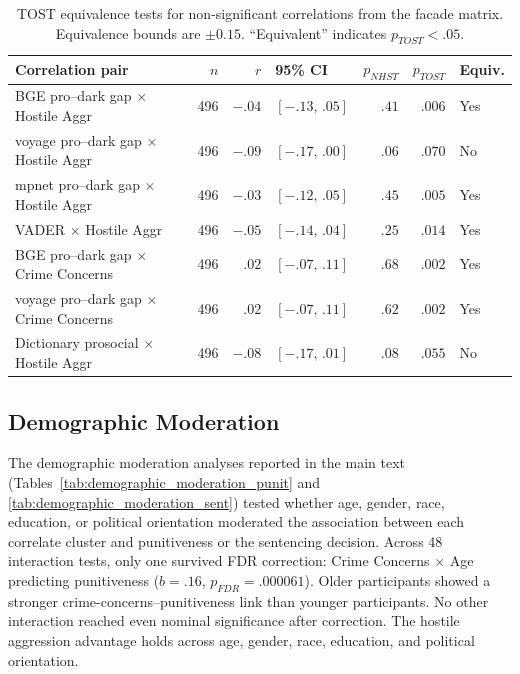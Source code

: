 \begin{table}[htbp]
  \centering
  \caption{TOST equivalence tests for non-significant correlations from the facade matrix. Equivalence bounds are $\pm 0.15$. ``Equivalent'' indicates $p_\textit{TOST} < .05$.}
  \label{tab:tost}
  \footnotesize
  \begin{tabular}{lrrlrrl}
    \toprule
    Correlation pair & $n$ & $r$ & 95\% CI & $p_\textit{NHST}$ & $p_\textit{TOST}$ & Equiv. \\
    \midrule
    BGE pro--dark gap $\times$ Hostile Aggr     & 496 & $-.04$ & $[-.13,\,.05]$ & $.41$ & $.006$ & Yes \\
    voyage pro--dark gap $\times$ Hostile Aggr  & 496 & $-.09$ & $[-.17,\,.00]$ & $.06$ & $.070$ & No \\
    mpnet pro--dark gap $\times$ Hostile Aggr   & 496 & $-.03$ & $[-.12,\,.05]$ & $.45$ & $.005$ & Yes \\
    VADER $\times$ Hostile Aggr                 & 496 & $-.05$ & $[-.14,\,.04]$ & $.25$ & $.014$ & Yes \\
    BGE pro--dark gap $\times$ Crime Concerns   & 496 & $.02$  & $[-.07,\,.11]$ & $.68$ & $.002$ & Yes \\
    voyage pro--dark gap $\times$ Crime Concerns & 496 & $.02$ & $[-.07,\,.11]$ & $.62$ & $.002$ & Yes \\
    Dictionary prosocial $\times$ Hostile Aggr  & 496 & $-.08$ & $[-.17,\,.01]$ & $.08$ & $.055$ & No \\
    \bottomrule
  \end{tabular}
\end{table}

\subsection{Demographic Moderation}
\label{sec:supp_demo_mod}

The demographic moderation analyses reported in the main text (Tables~\ref{tab:demographic_moderation_punit} and \ref{tab:demographic_moderation_sent}) tested whether age, gender, race, education, or political orientation moderated the association between each correlate cluster and punitiveness or the sentencing decision. Across 48 interaction tests, only one survived FDR correction: Crime Concerns $\times$ Age predicting punitiveness ($b = .16$, $p_\textit{FDR} = .000061$). Older participants showed a stronger crime-concerns--punitiveness link than younger participants. No other interaction reached even nominal significance after correction. The hostile aggression advantage holds across age, gender, race, education, and political orientation.
